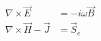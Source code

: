 \begin{equation}
\begin{split}
\nabla \times \vec{E} &= -i\omega\vec{B} \\
\nabla \times \vec{H} - \vec{J} &= \vec{S}_e
\end{split}
\label{eq:MaxwellFreq}
\end{equation}
